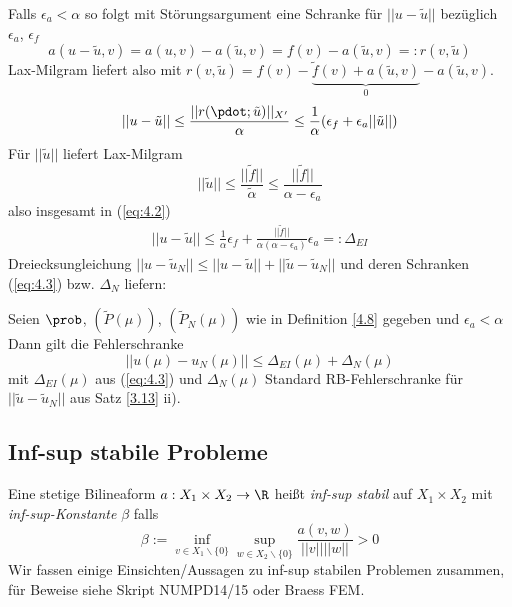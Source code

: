 \begin{bem}
Falls $\epsilon_a < \alpha$ so folgt mit Störungsargument eine Schranke für $||u - \tilde{u}||$ bezüglich $\epsilon_a$, $\epsilon_f$
\[
	a(u - \tilde{u},v) = a(u,v) - a(\tilde{u},v) = f(v) - a(\tilde{u},v) =: r(v, \tilde{u})
\]
Lax-Milgram liefert also mit $r(v,\tilde{u}) = f(v) - \underbrace{\tilde{f}(v) + a(\tilde{u},v)}_{0} - a(\tilde{u},v)$.
\begin{align} \label{eq:4.2}
 || u- \tilde{u}|| \leq \frac{||r(\pdot;\tilde{u})||_{X'}}{\alpha} \leq \frac{1}{\alpha} (\epsilon_f + \epsilon_a ||\tilde{u}||)
\end{align}
Für $||\tilde{u}||$ liefert Lax-Milgram
\[
	||\tilde{u}|| \leq \frac{||\tilde{f}||}{\tilde{\alpha}} \leq \frac{||\tilde{f}||}{\alpha - \epsilon_a}
\]
also insgesamt in (\ref{eq:4.2})
\begin{align} \label{eq:4.3}
	|| u - \tilde{u}|| \leq \frac{1}{\alpha} \epsilon_f + \frac{||\tilde{f}||}{\alpha(\alpha - \epsilon_a)} \epsilon_a =: \Delta_{EI}
\end{align}
Dreiecksungleichung $||u-\tilde{u}_N|| \leq || u - \tilde{u}|| + ||\tilde{u} - \tilde{u}_N||$ und deren Schranken (\ref{eq:4.3}) bzw. $\Delta_N$ liefern:
\end{bem}

\begin{kor}[EI-RB Fehlerschranke]
Seien $\prob$, $(\tilde{P}(\mu))$, $(\tilde{P}_N(\mu))$ wie in Definition \ref{4.8} gegeben und $\epsilon_a < \alpha$ Dann gilt die Fehlerschranke
\[
	||u(\mu) - u_N(\mu) || \leq \Delta_{EI} (\mu) + \Delta_N (\mu)
\]
mit $\Delta_{EI} (\mu)$ aus (\ref{eq:4.3}) und $\Delta_N(\mu)$ Standard RB-Fehlerschranke für $||\tilde{u} - \tilde{u}_N||$ aus Satz \ref{3.13} ii).
\end{kor}

\subsection{Inf-sup stabile Probleme}

\begin{defn}
Eine stetige Bilineaform $a: X_1 \times X_2 \rightarrow \R$ heißt \emph{inf-sup stabil} auf $X_1 \times X_2$ mit \emph{inf-sup-Konstante} $\beta$ falls
\[
	\beta := \inf\limits_{v \in X_1 \backslash \{0\}} \sup\limits_{w \in X_2 \backslash \{0\}} \frac{a(v,w)}{||v|| ||w||} > 0
\]
Wir fassen einige Einsichten/Aussagen zu inf-sup stabilen Problemen zusammen, für Beweise siehe Skript NUMPD14/15 oder Braess FEM.
\end{defn}

